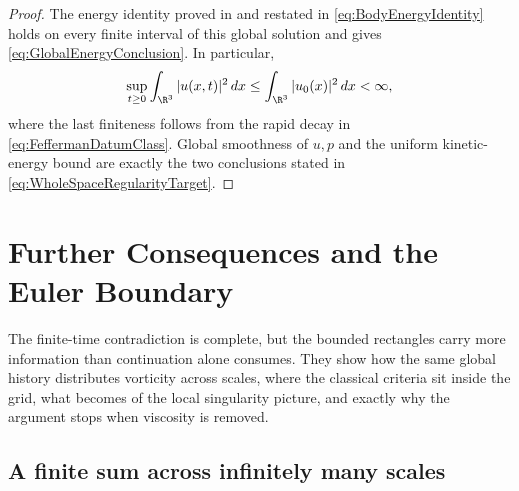 \begin{proof}
The energy identity proved in  and restated in \eqref{eq:BodyEnergyIdentity} holds on every finite
interval of this global solution and gives \eqref{eq:GlobalEnergyConclusion}.
In particular,
\[
  \sup_{t\geq0}\int_{\R^3}|u(x,t)|^2\,dx
  \leq
  \int_{\R^3}|u_0(x)|^2\,dx
  <\infty,
\]
where the last finiteness follows from the rapid decay in
\eqref{eq:FeffermanDatumClass}.  Global smoothness of \(u,p\) and the
uniform kinetic-energy bound are exactly the two conclusions stated in
\eqref{eq:WholeSpaceRegularityTarget}.
\end{proof}

\section{Further Consequences and the Euler Boundary}\label{sec:FurtherConsequencesAndEulerBoundary}

The finite-time contradiction is complete, but the bounded rectangles carry more information than continuation alone consumes.
They show how the same global history distributes vorticity across scales, where the classical criteria sit inside the grid, what becomes of the local singularity picture, and exactly why the argument stops when viscosity is removed.

\subsection{A finite sum across infinitely many scales}\label{sub:AFiniteSumAcrossScales}

